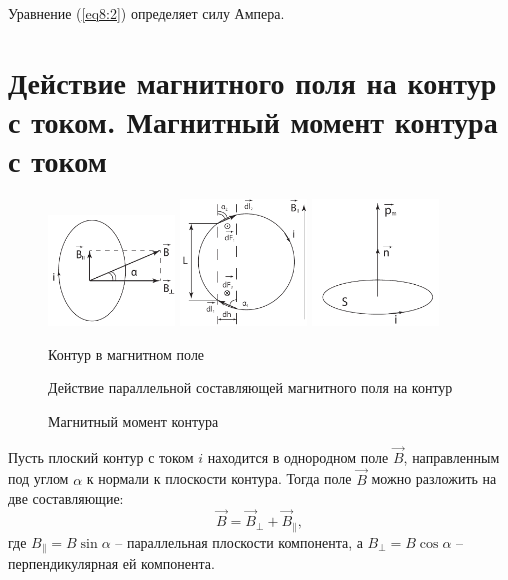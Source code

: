     Уравнение (\ref{eq8:2}) определяет силу Ампера.
    
\section{Действие магнитного поля на контур с током. Магнитный момент контура с
    током}
    \begin{figure}[b]
        \center
        \includegraphics[width=0.3\textwidth]{lec08/contour.pdf}
        \hfill
        \includegraphics[width=0.3\textwidth]{lec08/calculate_moment.pdf}
        \hfill
        \includegraphics[width=0.3\textwidth]{lec08/magnetic_moment.pdf}
        \parbox[t]{.3\textwidth}{\caption{Контур в магнитном поле}}
        \hfill
        \parbox[t]{.3\textwidth}{\caption{Действие параллельной составляющей
            магнитного поля на контур}}
        \hfill
        \parbox[t]{.3\textwidth}{\caption{Магнитный момент контура}}
    \end{figure}

    Пусть плоский контур с током \( i \) находится в однородном поле
    \( \vec{B} \), направленным под углом \( \alpha \) к нормали к плоскости
    контура. Тогда поле \( \vec{B} \) можно разложить на две составляющие:
    \[
        \vec{B} = \vec{B}_{\perp} + \vec{B}_{\|},
    \]
    где \( B_{\|} = B\sin\alpha \) -- параллельная плоскости компонента, а
    \( B_{\perp} = B\cos\alpha \) -- перпендикулярная ей компонента.
    
